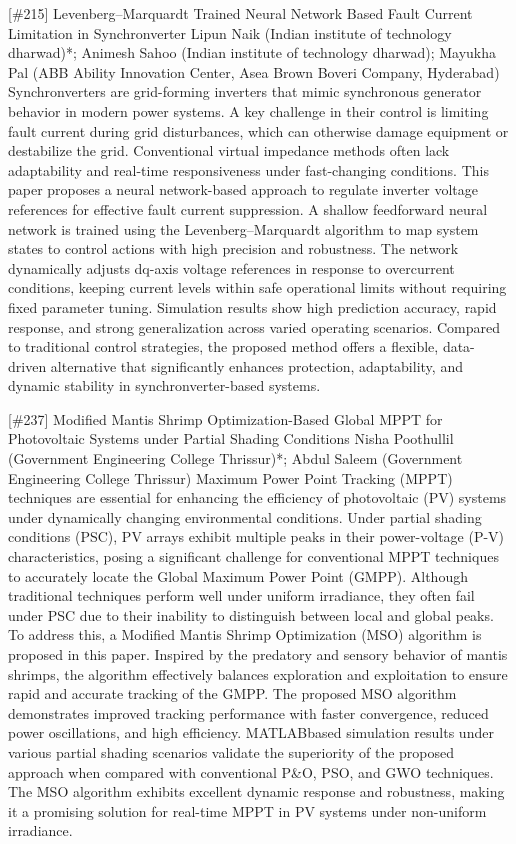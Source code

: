 {} \begin{abstract_online} {[\#215] Levenberg--Marquardt Trained Neural Network Based Fault Current Limitation in Synchronverter} {} {Lipun Naik (Indian institute of technology dharwad)*; Animesh Sahoo (Indian institute of technology dharwad); Mayukha Pal (ABB Ability Innovation Center, Asea Brown Boveri Company, Hyderabad)} {} Synchronverters are grid-forming inverters that mimic synchronous generator behavior in modern power systems. A key challenge in their control is limiting fault current during grid disturbances, which can otherwise damage equipment or destabilize the grid. Conventional virtual impedance methods often lack adaptability and real-time responsiveness under fast-changing conditions. This paper proposes a neural network-based approach to regulate inverter voltage references for effective fault current suppression. A shallow feedforward neural network is trained using the Levenberg--Marquardt algorithm to map system states to control actions with high precision and robustness. The network dynamically adjusts dq-axis voltage references in response to overcurrent conditions, keeping current levels within safe operational limits without requiring fixed parameter tuning. Simulation results show high prediction accuracy, rapid response, and strong generalization across varied operating scenarios. Compared to traditional control strategies, the proposed method offers a flexible, data-driven alternative that significantly enhances protection, adaptability, and dynamic stability in synchronverter-based systems. \end{abstract_online} 
{} \begin{abstract_online} {[\#237] Modified Mantis Shrimp Optimization-Based Global  MPPT for Photovoltaic Systems under Partial  Shading Conditions} {} {Nisha Poothullil (Government Engineering College Thrissur)*; Abdul Saleem (Government Engineering College Thrissur)} {} Maximum Power Point Tracking (MPPT) techniques are essential for enhancing the efficiency of photovoltaic (PV) systems under dynamically changing environmental conditions. Under partial shading conditions (PSC), PV arrays exhibit multiple peaks in their power-voltage (P-V) characteristics, posing a significant challenge for conventional MPPT techniques to accurately locate the Global Maximum Power Point (GMPP). Although traditional techniques perform well under uniform irradiance, they often fail under PSC due to their inability to distinguish between local and global peaks. To address this, a Modified Mantis Shrimp Optimization (MSO) algorithm is proposed in this paper. Inspired by the predatory and sensory behavior of mantis shrimps, the algorithm effectively balances exploration and exploitation to ensure rapid and accurate tracking of the GMPP. The proposed MSO algorithm demonstrates improved tracking performance with faster convergence, reduced power oscillations, and high efficiency. MATLABbased simulation results under various partial shading scenarios validate the superiority of the proposed approach when compared with conventional P\&O, PSO, and GWO techniques. The MSO algorithm exhibits excellent dynamic response and robustness, making it a promising solution for real-time MPPT in PV systems under non-uniform irradiance. \end{abstract_online} 
